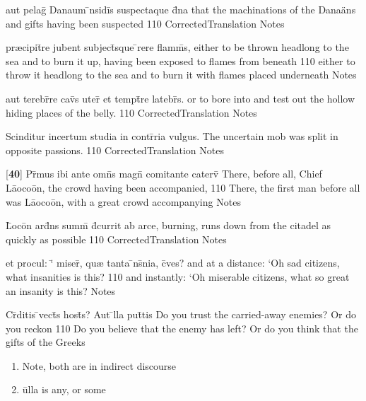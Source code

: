 \latline
  {aut pelag\={} Danaum \={\macron {\i}}nsidi\={}s suspectaque d\={}na}
  { that the machinations of the Dana\"ans and gifts having been suspected }
  {110}
  { CorrectedTranslation }
  { Notes }


\latline
  {pr{\ae}cipit\={}re jubent subject\={\macron {\i}}sque \={}rere flamm\={\macron {\i}}s,}
  { either to be thrown headlong to the sea and to burn it up, having been exposed to flames from beneath}
  {110}
  { either to throw it  headlong to the sea and to burn it with flames placed underneath }
  { Notes }


\latline
  {aut terebr\={}re cav\={}s uter\={\macron {\i}} et tempt\={}re latebr\={}s.}
  { or to bore into and test out the hollow hiding places of the belly. }
  {110}
  { CorrectedTranslation }
  { Notes }


\latline
  {Scinditur incertum studia in contr\={}ria vulgus.}
  { The uncertain mob was split in opposite passions. }
  {110}
  { CorrectedTranslation }
  { Notes }


\latline
  {[\textbf{40}] Pr\={\macron {\i}}mus ibi ante omn\={\macron {\i}}s magn\={} comitante caterv\={}}
  { There, before all, Chief L\={a}oco\={o}n, the crowd having been accompanied, }
  {110}
  { There, the first man before all was L\={a}oco\={o}n, with a great crowd accompanying }
  { Notes }


\latline
  {L\={}oco\={}n ard\={}ns summ\={} d\={}currit ab arce,}
  { burning, runs down from the citadel as quickly as possible   }
  {110}
  { CorrectedTranslation }
  { Notes }


\latline
  {et procul: `\={} miser\={\macron {\i}}, qu{\ae} tanta \={\macron {\i}}ns\={}nia, c\={\macron {\i}}ves?  }
  { and at a distance:  `Oh sad citizens, what insanities is this? }
  {110}
  { and instantly:  `Oh miserable citizens, what so great an insanity is this? }
  { Notes }


\latline
  {Cr\={}ditis \={}vect\={}s host\={\macron {\i}}s?  Aut \={}lla put\={}tis}
  { Do you trust the carried-away enemies?  Or do you reckon }
  {110}
  { Do you believe that the enemy has left?  Or do you think that the gifts of the Greeks }
  { \begin{enumerate}
  	\item Note, both are in indirect discourse
  	\item \={u}lla is any, or some
  \end{enumerate} }



